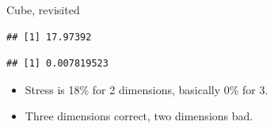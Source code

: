 \documentclass[ignorenonframetext,]{beamer}
\newenvironment{Shaded}{\begin{snugshade}}{\end{snugshade}}
\newcommand{\DataTypeTok}[1]{\textcolor[rgb]{0.13,0.29,0.53}{#1}}
\newcommand{\DecValTok}[1]{\textcolor[rgb]{0.00,0.00,0.81}{#1}}
\newcommand{\FloatTok}[1]{\textcolor[rgb]{0.00,0.00,0.81}{#1}}
\newcommand{\KeywordTok}[1]{\textcolor[rgb]{0.13,0.29,0.53}{\textbf{#1}}}
\newcommand{\NormalTok}[1]{#1}
\newcommand{\OperatorTok}[1]{\textcolor[rgb]{0.81,0.36,0.00}{\textbf{#1}}}
\newcommand{\StringTok}[1]{\textcolor[rgb]{0.31,0.60,0.02}{#1}}
\begin{document}
\begin{frame}[fragile]{Cube, revisited}
\protect\hypertarget{cube-revisited}{}

\small

\begin{Shaded}
\end{Shaded}

\begin{verbatim}
## [1] 17.97392
\end{verbatim}

\begin{Shaded}
\end{Shaded}

\begin{verbatim}
## [1] 0.007819523
\end{verbatim}

\normalsize

\begin{itemize}
\item
  Stress is 18\% for 2 dimensions, basically 0\% for 3.
\item
  Three dimensions correct, two dimensions bad.
\end{itemize}

\end{frame}
\end{document}
